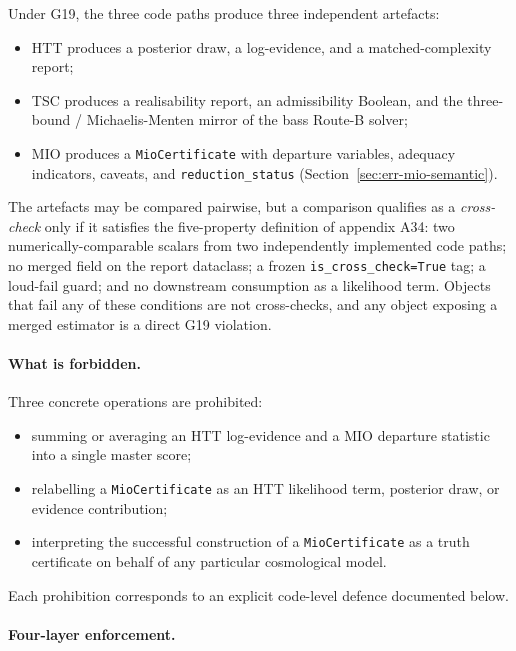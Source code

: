 Under G19, the three code paths produce three independent
artefacts:

\begin{itemize}
\item HTT produces a posterior draw, a log-evidence, and a
  matched-complexity report;
\item TSC produces a realisability report, an admissibility
  Boolean, and the three-bound / Michaelis-Menten mirror of
  the bass Route-B solver;
\item MIO produces a \texttt{MioCertificate} with departure
  variables, adequacy indicators, caveats, and
  \texttt{reduction\_status}
  (Section~\ref{sec:err-mio-semantic}).
\end{itemize}

The artefacts may be compared pairwise, but a comparison
qualifies as a \emph{cross-check} only if it satisfies the
five-property definition of appendix A34: two
numerically-comparable scalars from two independently
implemented code paths; no merged field on the report
dataclass; a frozen \texttt{is\_cross\_check=True} tag; a
loud-fail guard; and no downstream consumption as a
likelihood term.  Objects that fail any of these conditions
are not cross-checks, and any object exposing a merged
estimator is a direct G19 violation.


\paragraph{What is forbidden.}

Three concrete operations are prohibited:

\begin{itemize}
\item summing or averaging an HTT log-evidence and a MIO
  departure statistic into a single master score;
\item relabelling a \texttt{MioCertificate} as an HTT
  likelihood term, posterior draw, or evidence
  contribution;
\item interpreting the successful construction of a
  \texttt{MioCertificate} as a truth certificate on behalf
  of any particular cosmological model.
\end{itemize}

Each prohibition corresponds to an explicit code-level
defence documented below.


\paragraph{Four-layer enforcement.}

